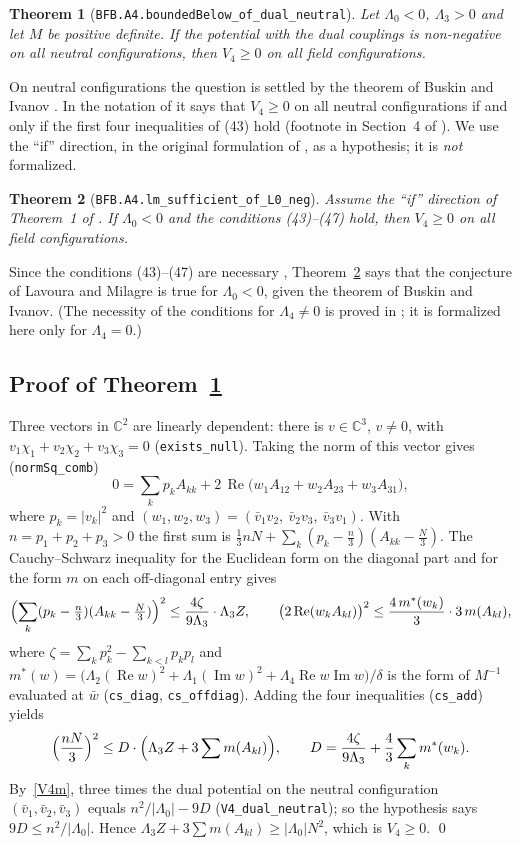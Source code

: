\documentclass[11pt,a4paper]{amsart}
\newtheorem{theorem}{Theorem}
\theoremstyle{remark}
\newcommand{\C}{\mathbb{C}}
\newcommand{\La}{\Lambda}
\newcommand{\lean}[1]{\texttt{#1}}
\renewcommand{\Re}{\operatorname{Re}}
\renewcommand{\Im}{\operatorname{Im}}
\begin{document}
\begin{theorem}[\lean{BFB.A4.boundedBelow\_of\_dual\_neutral}]\label{thm:dual}
Let $\La_0<0$, $\La_3>0$ and let $M$ be positive definite. If the potential with the dual couplings is
non-negative on all neutral configurations, then $V_4\ge0$ on all field configurations.
\end{theorem}

On neutral configurations the question is settled by the theorem of Buskin and Ivanov \cite[Theorem~1]{BI}. In the
notation of \cite{LM} it says that $V_4\ge0$ on all neutral configurations if and only if the first four
inequalities of (43) hold (footnote in Section~4 of \cite{LM}). We use the ``if'' direction, in the original
formulation of \cite{BI}, as a hypothesis; it is \emph{not} formalized.

\begin{theorem}[\lean{BFB.A4.lm\_sufficient\_of\_L0\_neg}]\label{thm:neg}
Assume the ``if'' direction of Theorem~1 of \cite{BI}. If $\La_0<0$ and the conditions \textup{(43)--(47)} hold, then
$V_4\ge0$ on all field configurations.
\end{theorem}

Since the conditions (43)--(47) are necessary \cite{LM}, Theorem~\ref{thm:neg} says that the conjecture of Lavoura
and Milagre is true for $\La_0<0$, given the theorem of Buskin and Ivanov. (The necessity of the conditions for
$\La_4\neq0$ is proved in \cite{LM}; it is formalized here only for $\La_4=0$.)

\subsection{Proof of Theorem~\ref{thm:dual}}
Three vectors in $\C^2$ are linearly dependent: there is $v\in\C^3$, $v\neq0$, with $v_1\chi_1+v_2\chi_2+v_3\chi_3=0$
(\lean{exists\_null}). Taking the norm of this vector gives (\lean{normSq\_comb})
\[
0=\sum_kp_kA_{kk}+2\,\Re\bigl(w_1A_{12}+w_2A_{23}+w_3A_{31}\bigr),
\]
where $p_k=|v_k|^2$ and $(w_1,w_2,w_3)=(\bar v_1v_2,\ \bar v_2v_3,\ \bar v_3v_1)$.
With $n=p_1+p_2+p_3>0$ the first sum is $\tfrac13nN+\sum_k(p_k-\tfrac n3)(A_{kk}-\tfrac N3)$. The
Cauchy--Schwarz inequality for the Euclidean form on the diagonal part and for the form $m$ on each off-diagonal
entry gives
\[
\Bigl(\sum_k(p_k-\tfrac n3)(A_{kk}-\tfrac N3)\Bigr)^2\le\frac{4\zeta}{9\La_3}\cdot\La_3Z,\qquad
\bigl(2\Re(w_kA_{kl})\bigr)^2\le\frac{4\,m^*(w_k)}{3}\cdot3\,m(A_{kl}),
\]
where $\zeta=\sum_kp_k^2-\sum_{k<l}p_kp_l$ and $m^*(w)=\bigl(\La_2(\Re w)^2+\La_1(\Im w)^2+\La_4\Re w\Im w\bigr)/\delta$
is the form of $M^{-1}$ evaluated at $\bar w$ (\lean{cs\_diag}, \lean{cs\_offdiag}). Adding the four inequalities
(\lean{cs\_add}) yields
\[
\Bigl(\frac{nN}{3}\Bigr)^2\le D\cdot\Bigl(\La_3Z+3\sum m(A_{kl})\Bigr),\qquad
D=\frac{4\zeta}{9\La_3}+\frac43\sum_km^*(w_k).
\]
By~\eqref{V4m}, three times the dual potential on the neutral configuration $(\bar v_1,\bar v_2,\bar v_3)$ equals
$n^2/|\La_0|-9D$ (\lean{V4\_dual\_neutral}); so the hypothesis says $9D\le n^2/|\La_0|$. Hence
$\La_3Z+3\sum m(A_{kl})\ge|\La_0|N^2$, which is $V_4\ge0$. \qed
\end{document}
